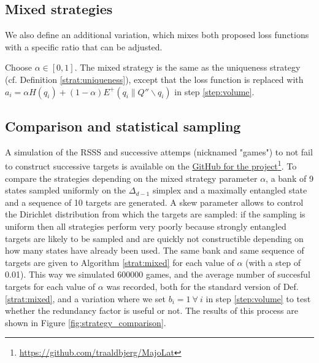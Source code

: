 


\subsection{Mixed strategies}

We also define an additional variation, which mixes both proposed loss functions with a specific ratio that can be adjusted.

\begin{definition} \label{strat:mixed}
    Choose $\alpha \in [0, 1]$. The mixed strategy is the same as the uniqueness strategy (cf. Definition \ref{strat:uniqueness}), except that the loss function is replaced with $a_i = \alpha H(q_i) + (1 - \alpha) E^+(q_i \parallel Q'' \backslash q_i)$ in step \ref{step:volume}.
\end{definition}



\subsection{Comparison and statistical sampling}

A simulation of the RSSS and successive attemps (nicknamed "games") to not fail to construct successive targets is available on the \href{https://github.com/traaldbjerg/MajoLat}{GitHub for the project}\footnote{\url{https://github.com/traaldbjerg/MajoLat}}. To compare the strategies depending on the mixed strategy parameter $\alpha$, a bank of 9 states sampled uniformly on the $\Delta_{d-1}$ simplex and a maximally entangled state and a sequence of 10 targets are generated. A skew parameter allows to control the Dirichlet distribution from which the targets are sampled: if the sampling is uniform then all strategies perform very poorly because strongly entangled targets are likely to be sampled and are quickly not constructible depending on how many states have already been used. The same bank and same sequence of targets are given to Algorithm \ref{strat:mixed} for each value of $\alpha$ (with a step of 0.01). This way we simulated 600000 games, and the average number of succesful targets for each value of $\alpha$ was recorded, both for the standard version of Def. \ref{strat:mixed}, and a variation where we set $b_i = 1 \: \forall \: i$ in step \ref{step:volume} to test whether the redundancy factor is useful or not. The results of this process are shown in Figure \ref{fig:strategy_comparison}.

